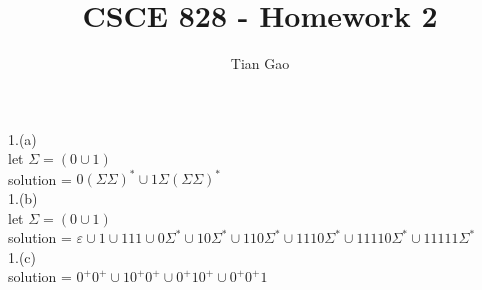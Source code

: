 \documentclass[a4paper]{article}
\title{CSCE 828 - Homework 2}
\author{Tian Gao}
\begin{document}
\maketitle

1.(a) \\
let $\Sigma = (0 \cup 1)$ \\
solution = $0 (\Sigma \Sigma)^{*} \cup 1 \Sigma (\Sigma \Sigma)^{*}$\\
1.(b)\\
let $\Sigma = (0 \cup 1)$ \\
solution = $\varepsilon \cup 1 \cup 111 \cup 0 \Sigma^{*} \cup 10 \Sigma^{*} \cup 110 \Sigma^{*} \cup 1110 \Sigma^{*} \cup 11110 \Sigma^{*} \cup 11111 \Sigma^{*}$\\
1.(c)\\
solution = $0^+0^+ \cup 10^+0^+ \cup 0^+10^+ \cup 0^+0^+1$\\
\end{document}
